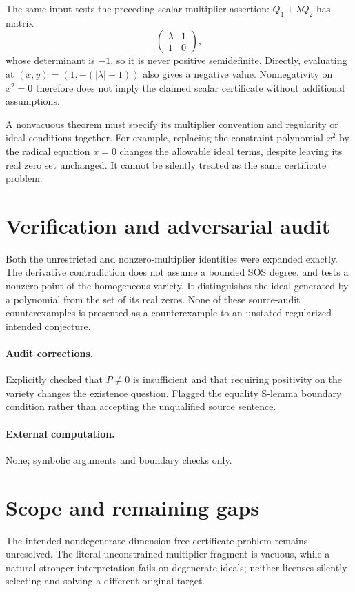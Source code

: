\documentclass[11pt]{article}
\begin{document}
The same input tests the preceding scalar-multiplier assertion: $Q_1+\lambda Q_2$ has matrix
\[
\begin{pmatrix}\lambda&1\\1&0\end{pmatrix},
\]
whose determinant is $-1$, so it is never positive semidefinite. Directly, evaluating at $(x,y)=(1,-(|\lambda|+1))$ also gives a negative value. Nonnegativity on $x^2=0$ therefore does not imply the claimed scalar certificate without additional assumptions.

A nonvacuous theorem must specify its multiplier convention and regularity or ideal conditions together. For example, replacing the constraint polynomial $x^2$ by the radical equation $x=0$ changes the allowable ideal terms, despite leaving its real zero set unchanged. It cannot be silently treated as the same certificate problem.
\section{Verification and adversarial audit}
Both the unrestricted and nonzero-multiplier identities were expanded exactly. The derivative contradiction does not assume a bounded SOS degree, and tests a nonzero point of the homogeneous variety. It distinguishes the ideal generated by a polynomial from the set of its real zeros. None of these source-audit counterexamples is presented as a counterexample to an unstated regularized intended conjecture.
\paragraph{Audit corrections.} Explicitly checked that $P\ne0$ is insufficient and that requiring positivity on the variety changes the existence question. Flagged the equality S-lemma boundary condition rather than accepting the unqualified source sentence.
\paragraph{External computation.} None; symbolic arguments and boundary checks only.
\section{Scope and remaining gaps}
The intended nondegenerate dimension-free certificate problem remains unresolved. The literal unconstrained-multiplier fragment is vacuous, while a natural stronger interpretation fails on degenerate ideals; neither licenses silently selecting and solving a different original target.
\end{document}
